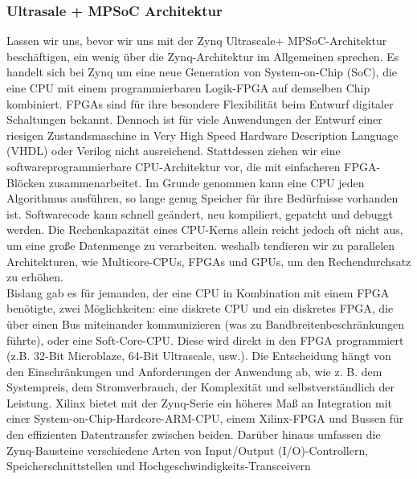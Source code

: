 

\subsubsection{Ultrasale + MPSoC Architektur}
Lassen wir uns, bevor wir uns mit der Zynq Ultrascale+ MPSoC-Architektur beschäftigen, ein wenig über die Zynq-Architektur im Allgemeinen sprechen. Es handelt sich bei Zynq um eine neue Generation von System-on-Chip (SoC), die eine CPU mit einem programmierbaren Logik-FPGA auf demselben Chip kombiniert.
FPGAs sind für ihre besondere Flexibilität beim Entwurf digitaler Schaltungen bekannt. Dennoch ist für viele Anwendungen der Entwurf einer riesigen Zustandsmaschine in Very High Speed Hardware Description Language (VHDL) oder Verilog nicht ausreichend. Stattdessen ziehen wir eine softwareprogrammierbare CPU-Architektur vor, die mit einfacheren FPGA-Blöcken zusammenarbeitet. Im Grunde genommen kann eine CPU jeden Algorithmus ausführen, so lange genug Speicher für ihre Bedürfnisse vorhanden ist. Softwarecode kann schnell geändert, neu kompiliert, gepatcht und debuggt werden. Die Rechenkapazität eines CPU-Kerns allein reicht jedoch oft nicht aus, um eine große Datenmenge zu verarbeiten. weshalb tendieren wir zu parallelen Architekturen, wie Multicore-CPUs, FPGAs und GPUs, um den Rechendurchsatz zu erhöhen.\\

Bislang gab es für jemanden, der eine CPU in Kombination mit einem FPGA benötigte, zwei Möglichkeiten: eine diskrete CPU und ein diskretes FPGA, die über einen Bus miteinander kommunizieren (was zu Bandbreitenbeschränkungen führte), oder eine Soft-Core-CPU. Diese wird direkt in den FPGA programmiert (z.B. 32-Bit Microblaze, 64-Bit Ultrascale, usw.). Die Entscheidung hängt von den Einschränkungen und Anforderungen der Anwendung ab, wie z. B. dem Systempreis, dem Stromverbrauch, der Komplexität und selbstverständlich der Leistung. Xilinx bietet mit der Zynq-Serie ein höheres Maß an Integration mit einer System-on-Chip-Hardcore-ARM-CPU, einem Xilinx-FPGA und Bussen für den effizienten Datentransfer zwischen beiden. Darüber hinaus umfassen die Zynq-Bausteine verschiedene Arten von Input/Output (I/O)-Controllern, Speicherschnittstellen und Hochgeschwindigkeits-Transceivern

